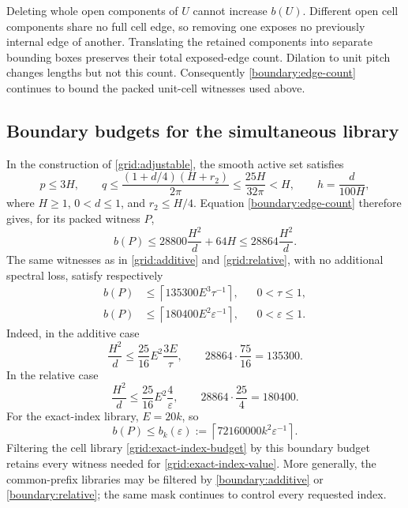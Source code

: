 \documentclass[11pt,reqno]{amsart}
\numberwithin{equation}{section}
\begin{document}
Deleting whole open components of \(U\) cannot increase \(b(U)\).
Different open cell components share no full cell edge, so removing
one exposes no previously internal edge of another.  Translating
the retained components into separate bounding boxes preserves
their total exposed-edge count.  Dilation to unit pitch changes
lengths but not this count.  Consequently \eqref{boundary:edge-count}
continues to bound the packed unit-cell witnesses used above.

\subsection{Boundary budgets for the simultaneous library}
\label{boundary:prefix-section}

In the construction of \eqref{grid:adjustable}, the smooth active
set satisfies
\[
 p\le3H,\qquad
 q\le\frac{(1+d/4)(H+r_2)}{2\pi}
 \le\frac{25H}{32\pi}<H,\qquad
 h=\frac{d}{100H},
\]
where \(H\ge1\), \(0<d\le1\), and \(r_2\le H/4\).
Equation \eqref{boundary:edge-count} therefore gives, for its
packed witness \(P\),
\begin{equation}
 b(P)\le28800\frac{H^2}{d}+64H
       \le28864\frac{H^2}{d}.
 \label{boundary:adjustable}
\end{equation}
The same witnesses as in \eqref{grid:additive} and
\eqref{grid:relative}, with no additional spectral loss, satisfy
respectively
\begin{align}
 b(P)&\le
       \left\lceil135300E^3\tau^{-1}\right\rceil,
       &&0<\tau\le1,
 \label{boundary:additive}\\
 b(P)&\le
       \left\lceil180400E^2\varepsilon^{-1}\right\rceil,
       &&0<\varepsilon\le1.
 \label{boundary:relative}
\end{align}
Indeed, in the additive case
\[
 \frac{H^2}{d}
 \le\frac{25}{16}E^2\frac{3E}{\tau},
 \qquad
 28864\cdot\frac{75}{16}=135300.
\]
In the relative case
\[
 \frac{H^2}{d}
 \le\frac{25}{16}E^2\frac4{\varepsilon},
 \qquad
 28864\cdot\frac{25}{4}=180400.
\]
For the exact-index library, \(E=20k\), so
\begin{equation}
 b(P)\le b_k(\varepsilon)
 :=\left\lceil72160000k^2\varepsilon^{-1}\right\rceil.
 \label{boundary:exact-index}
\end{equation}
Filtering the cell library \eqref{grid:exact-index-budget} by this
boundary budget retains every witness needed for
\eqref{grid:exact-index-value}.  More generally, the common-prefix
libraries may be filtered by \eqref{boundary:additive} or
\eqref{boundary:relative}; the same mask continues to control
every requested index.
\end{document}
